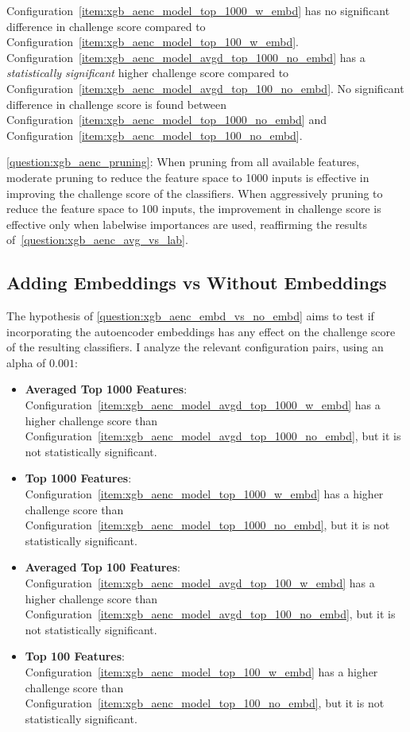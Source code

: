 \documentclass[\main/thesis.tex]{subfiles}
\begin{document}
\begin{itemize}
    Configuration~\ref{item:xgb_aenc_model_top_1000_w_embd} has no significant difference in challenge score compared to Configuration~\ref{item:xgb_aenc_model_top_100_w_embd}.
    Configuration~\ref{item:xgb_aenc_model_avgd_top_1000_no_embd} has a \emph{statistically significant} higher challenge score compared to Configuration~\ref{item:xgb_aenc_model_avgd_top_100_no_embd}.
    No significant difference in challenge score is found between Configuration~\ref{item:xgb_aenc_model_top_1000_no_embd} and Configuration~\ref{item:xgb_aenc_model_top_100_no_embd}.
\end{itemize}

\ref{question:xgb_aenc_pruning}: When pruning from all available features, moderate pruning to reduce the feature space to 1000 inputs is effective in improving the challenge score of the classifiers.
When aggressively pruning to reduce the feature space to 100 inputs, the improvement in challenge score is effective only when labelwise importances are used, reaffirming the results of~\ref{question:xgb_aenc_avg_vs_lab}.

\subsection{Adding Embeddings vs Without Embeddings}
The hypothesis of \ref{question:xgb_aenc_embd_vs_no_embd} aims to test if incorporating the autoencoder embeddings has any effect on the challenge score of the resulting classifiers.
I analyze the relevant configuration pairs, using an alpha of $0.001$:
\begin{itemize}
    \item \textbf{Averaged Top 1000 Features}: Configuration~\ref{item:xgb_aenc_model_avgd_top_1000_w_embd} has a higher challenge score than Configuration~\ref{item:xgb_aenc_model_avgd_top_1000_no_embd}, but it is not statistically significant.
    \item \textbf{Top 1000 Features}: Configuration~\ref{item:xgb_aenc_model_top_1000_w_embd} has a higher challenge score than Configuration~\ref{item:xgb_aenc_model_top_1000_no_embd}, but it is not statistically significant.
    \item \textbf{Averaged Top 100 Features}: Configuration~\ref{item:xgb_aenc_model_avgd_top_100_w_embd} has a higher challenge score than Configuration~\ref{item:xgb_aenc_model_avgd_top_100_no_embd}, but it is not statistically significant.
    \item \textbf{Top 100 Features}: Configuration~\ref{item:xgb_aenc_model_top_100_w_embd} has a higher challenge score than Configuration~\ref{item:xgb_aenc_model_top_100_no_embd}, but it is not statistically significant.
\end{itemize}
\end{document}
